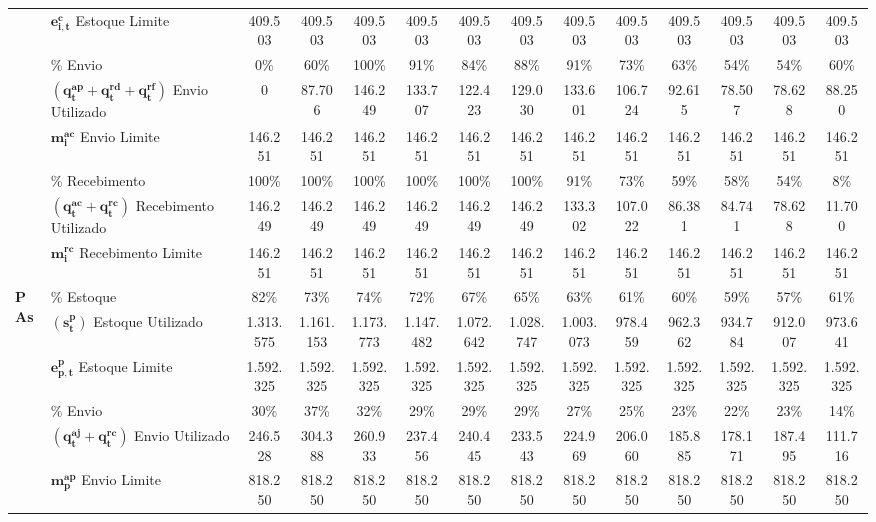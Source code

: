 \begin{table}
{\begin{tabular}{|l|l|c|c|c|c|c|c|c|c|c|c|c|c|}
& $\mathbf{e^{c}_{i,t}}$ Estoque Limite & 409.503 & 409.503 & 409.503 & 409.503 & 409.503 & 409.503 & 409.503 & 409.503 & 409.503 & 409.503 & 409.503 & 409.503 \\\cline{2-14}
& $\mathbf{\%}$ Envio & 0\% & 60\% & 100\% & 91\% & 84\% & 88\% & 91\% & 73\% & 63\% & 54\% & 54\% & 60\% \\\cline{2-14}
& $(\mathbf{q^{ap}_{t} + q^{rd}_{t} + q^{rf}_{t}})$ Envio Utilizado & 0 & 87.706 & 146.249 & 133.707 & 122.423 & 129.030 & 133.601 & 106.724 & 92.615 & 78.507 & 78.628 & 88.250 \\\cline{2-14}
& $\mathbf{m^{ac}_{i}}$ Envio Limite & 146.251 & 146.251 & 146.251 & 146.251 & 146.251 & 146.251 & 146.251 & 146.251 & 146.251 & 146.251 & 146.251 & 146.251 \\\cline{2-14}
& $\mathbf{\%}$ Recebimento & 100\% & 100\% & 100\% & 100\% & 100\% & 100\% & 91\% & 73\% & 59\% & 58\% & 54\% & 8\% \\\cline{2-14}
& $(\mathbf{q^{ac}_{t} + q^{rc}_{t}})$ Recebimento Utilizado & 146.249 & 146.249 & 146.249 & 146.249 & 146.249 & 146.249 & 133.302 & 107.022 & 86.381 & 84.741 & 78.628 & 11.700 \\\cline{2-14}
& $\mathbf{m^{rc}_{i}}$ Recebimento Limite & 146.251 & 146.251 & 146.251 & 146.251 & 146.251 & 146.251 & 146.251 & 146.251 & 146.251 & 146.251 & 146.251 & 146.251 \\
\hline
\multirow{9}{*}{\textbf{PAs}} & $\mathbf{\%}$ Estoque & 82\% & 73\% & 74\% & 72\% & 67\% & 65\% & 63\% & 61\% & 60\% & 59\% & 57\% & 61\% \\\cline{2-14}
& $(\mathbf{s^{p}_{t}})$ Estoque Utilizado & 1.313.575 & 1.161.153 & 1.173.773 & 1.147.482 & 1.072.642 & 1.028.747 & 1.003.073 & 978.459 & 962.362 & 934.784 & 912.007 & 973.641 \\\cline{2-14}
& $\mathbf{e^{p}_{p,t}}$ Estoque Limite & 1.592.325 & 1.592.325 & 1.592.325 & 1.592.325 & 1.592.325 & 1.592.325 & 1.592.325 & 1.592.325 & 1.592.325 & 1.592.325 & 1.592.325 & 1.592.325 \\\cline{2-14}
& $\mathbf{\%}$ Envio & 30\% & 37\% & 32\% & 29\% & 29\% & 29\% & 27\% & 25\% & 23\% & 22\% & 23\% & 14\% \\\cline{2-14}
& $(\mathbf{q^{aj}_{t} + q^{rc}_{t}})$ Envio Utilizado & 246.528 & 304.388 & 260.933 & 237.456 & 240.445 & 233.543 & 224.969 & 206.060 & 185.885 & 178.171 & 187.495 & 111.716 \\\cline{2-14}
& $\mathbf{m^{ap}_{p}}$ Envio Limite & 818.250 & 818.250 & 818.250 & 818.250 & 818.250 & 818.250 & 818.250 & 818.250 & 818.250 & 818.250 & 818.250 & 818.250 \\\cline{2-14}

\end{tabular}}
\end{table}
